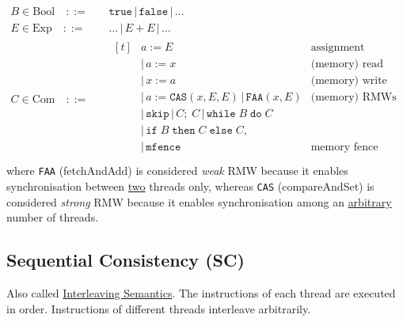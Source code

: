 \documentclass[twocolumn,landscape,10pt]{article}
\theoremstyle{definition}
\begin{document}
\begin{align*}
    B\in \text{Bool}\quad::=& \quad\texttt{true} \,|\, \texttt{false} \,|\, \ldots \\
    E\in \text{Exp}\quad::=&\quad\ldots \,|\, E + E \,|\, \ldots \\
    C\in \text{Com}\quad::=&\quad
    \begin{aligned}[t]
        & a := E & \text{assignment} \\
        & |\,a := x & \text{(memory) read} \\
        & |\,x := a & \text{(memory) write} \\
        & |\,a := \texttt{CAS}(x,E,E)\,|\,\texttt{FAA}(x,E) & \text{(memory) RMWs} \\
        & |\,\texttt{skip}\,|\,C;\;C\,|\,\texttt{while}\;B\;\texttt{do}\;C & \\
        & |\,\texttt{if}\;B\;\texttt{then}\;C\;\texttt{else}\;C, & \\
        & |\,\texttt{mfence} & \text{memory fence (TSO only)} \\
    \end{aligned}
\end{align*} 
where \texttt{FAA} (fetchAndAdd) is considered \emph{weak}
RMW because it enables synchronisation between \underline{two} threads only,
whereas \texttt{CAS} (compareAndSet) is considered \emph{strong} RMW because it
enables synchronisation among an \underline{arbitrary} number of threads.


\subsection{Sequential Consistency (SC)}

Also called \underline{Interleaving Semantics}. 
The instructions of each thread are executed in order.
Instructions of different threads interleave arbitrarily.
\end{document}
